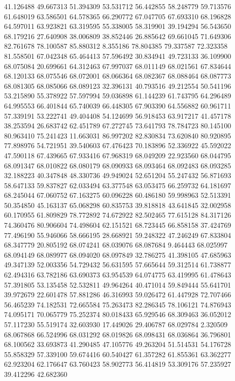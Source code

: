 41.126488
49.667313
51.394309
53.531712
56.442855
58.248779
59.713576
61.648019
63.586501
64.578365
66.290772
67.047705
67.693310
68.196828
64.597011
63.923821
63.319595
55.338005
58.319901
39.194294
56.543650
68.179216
27.640908
38.006809
38.852446
26.885642
69.661045
71.649306
82.761678
78.100587
85.880312
8.355186
78.804385
79.337587
72.323358
81.558501
67.042348
65.464413
57.596492
30.834941
49.723133
36.109900
68.075084
20.699661
64.312463
67.997037
68.011149
68.021561
67.834644
68.120133
68.075546
68.072001
68.066364
68.082367
68.088464
68.087773
68.081305
68.085066
68.089123
32.396131
40.793516
49.212554
50.541196
53.215890
55.378922
57.597994
59.036898
61.144239
61.743795
64.296489
64.995553
66.401844
65.740039
66.448305
67.903390
64.556882
60.961711
57.339191
53.222741
49.404408
54.124699
56.918453
63.917217
41.457178
38.253594
26.683742
62.451789
67.272745
73.641793
78.784723
80.145100
80.963410
75.241423
11.663031
86.997202
82.830834
73.620840
80.920895
77.898976
54.721951
39.540603
67.476423
70.183896
52.336922
45.592022
47.590118
67.439665
67.933416
67.968319
68.049209
22.923560
68.044795
68.091347
68.010822
68.080179
68.090933
68.093464
68.092483
68.093285
32.188223
40.347848
48.330736
49.949024
52.651204
55.247432
56.871693
58.647133
59.837827
62.033494
63.377548
63.053475
66.259732
64.181697
68.245044
67.060752
67.163275
60.096228
60.486180
59.998963
52.513391
50.354850
45.163137
65.068298
60.835753
39.818818
43.641845
32.002958
60.170955
61.809829
78.772892
74.672922
82.502465
77.615128
84.317126
74.360476
80.906604
74.498604
62.151521
68.723445
66.858158
37.424769
77.496190
55.946066
58.666195
28.668921
59.248322
47.246249
67.833804
68.347779
20.805192
68.074241
68.039076
68.087684
9.464443
68.025997
68.094149
68.089977
68.094020
68.097849
32.786275
41.398105
47.685963
49.347139
52.003356
54.729432
56.631595
57.665644
59.312514
61.738877
62.494316
63.782186
63.690373
63.954539
64.074775
63.419995
61.478643
57.391805
53.135458
52.532811
49.964264
40.471014
59.849444
55.641701
39.972679
22.601478
57.881286
46.316993
59.026472
61.447928
72.707466
56.465239
74.182531
72.665584
75.263473
82.286345
78.106121
74.876943
74.095171
70.065779
75.252374
80.018433
65.929546
68.309463
36.052012
57.117230
55.519174
32.603930
17.449026
29.406787
68.029784
2.320509
68.067868
66.524996
68.031292
68.019826
68.098431
68.036864
36.796801
68.100562
33.693873
41.290485
47.105776
49.263204
51.514531
54.176728
55.858329
57.339100
59.674416
60.540427
61.357282
61.855361
63.362277
62.923204
62.176647
63.760423
58.902773
56.414819
53.309176
57.235927
39.412296
42.682360
